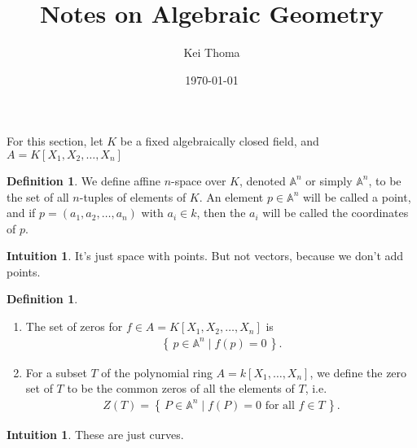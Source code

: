 \documentclass[11pt]{book}
\title{Notes on Algebraic Geometry}
\author{Kei Thoma}
\date{\today}
\theoremstyle{definition}
\newtheorem{definition}[theorem]{Definition}
\newtheorem{intuition}[theorem]{Intuition}
\numberwithin{equation}{section}
\newcommand{\makeset}[2]{\left\{\, #1 \mathrel{\mid} #2 \,\right\}}
\begin{document}
\maketitle
\tableofcontents

\cite{hartshorne1977}
\newpage
For this section, let \(K\) be a fixed algebraically closed field, and \(A = K[X_1, X_2, \ldots, X_n]\)
\begin{defbox}
    \begin{definition}
        We define affine \( n \)-space over \( K \), denoted \( \mathbb{A}^n \) or simply \( \mathbb{A}^n \), to be the set of all \( n \)-tuples of elements of \( K \). An element \( p \in \mathbb{A}^n \) will be called a point, and if \( p = (a_1, a_2, \ldots, a_n) \) with \( a_i \in k \), then the \( a_i \) will be called the coordinates of \( p \).
    \end{definition}
\end{defbox}

\begin{intbox}
\begin{intuition}
It's just space with points. But not vectors, because we don't add points.
\end{intuition}
\end{intbox}

\begin{defbox}
    \begin{definition}
        \begin{enumerate}
            \item The set of zeros for \(f \in A = K[X_1, X_2, \ldots, X_n]\) is
            \begin{align*}
                \makeset{p \in \mathbb{A}^n}{f(p) = 0}\text{.}
            \end{align*}
        
            \item For a subset \(T\) of the polynomial ring \(A = k[X_1, \ldots, X_n]\), we define the zero set of \(T\) to be the common zeros of all the elements of \(T\), i.e.
            \begin{align*}
                Z(T) = \makeset{P \in \mathbb{A}^n}{f(P) = 0 \text{ for all } f \in T} \text{.}
            \end{align*}
        \end{enumerate}
    \end{definition}
\end{defbox}

\begin{intbox}
    \begin{intuition}
        These are just curves.
    \end{intuition}
\end{intbox}
\end{document}
